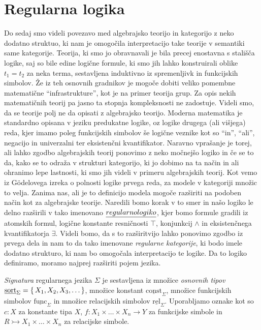 \documentclass[../kategoricna_logika.tex]{subfiles}
\begin{document}
\section{Regularna logika}
Do sedaj smo videli povezavo med algebrajsko teorijo in kategorijo z neko dodatno struktuo, ki nam je omogočila interpretacijo take teorije v semantiki same kategorije. Teorija, ki smo jo obravnavali je bila precej enostavna s stališča logike, saj so bile edine logične formule, ki smo jih lahko konstruirali oblike $t_1 = t_2$ za neka terma, sestavljena induktivno iz spremenljivk in funkcijskih simbolov. 
Že iz teh osnovnih gradnikov je mogoče dobiti veliko pomembne matematične ``infrastrukture'', kot je na primer teorija grup. Za opis nekih matematičnih teorij pa jasno ta stopnja kompleksnosti ne zadostuje.
Videli smo, da se teorije polj ne da opisati z algebrajsko teorijo. Moderna matematika je standardno opisana v jeziku predukatne logike, oz logike drugega (ali višjega) reda, kjer imamo poleg funkcijskih simbolov še logične veznike kot so ``in'', ``ali'', negacijo in univerzalni ter eksistenčni kvantifikator.
Naravno vprašanje je torej, ali lahko zgodbo algebrajskih teorij ponovimo z neko močnejšo logiko in če se to da, kako se to odraža v strukturi kategorijo, ki jo dobimo na ta način in ali ohranimo lepe lastnosti, ki smo jih videli v primeru algebrajskih teorij.
Kot vemo iz Gödelovega izreka o polnosti logike prvega reda, za modele v kategoriji množic to velja. Zanima nas, ali je to definicijo modela mogoče razširiti na podoben način kot za algebrajske teorije.
Naredili bomo korak v to smer in našo logiko le delno razširili v tako imenovano $\emph{regularno logiko}$, kjer bomo formule gradili iz atomskih formul, logične konstante resničnosti $\top$, konjunkcij $\wedge$ in eksistenčnega kvantifikatorja $\exists$.
Videli bomo, da s to razširitvijo lahko ponovimo zgodbo iz prvega dela in nam to da tako imenovane \emph{regularne kategorije}, ki bodo imele dodatno strukturo, ki nam bo omogočala interpretacijo te logike.
Da to logiko definiramo, moramo najprej razširiti pojem jezika.
%
\begin{definicija}
  \emph{Signatura} regularnega jezika $\Sigma$ je sestavljena iz množice \emph{osnovnih tipov} $\underline{\mathrm{sort}}_\Sigma = \left\lbrace\,X_1, X_2, X_3, \ldots\,\right\rbrace$, množice konstant $\underline{\mathrm{const}}_\Sigma$, množice funkcijskih simbolov $\underline{\mathrm{func}}_\Sigma$ in množice relacijskih simbolov $\underline{\mathrm{rel}}_\Sigma$. Uporabljamo oznake kot so $c : X$ za konstante tipa $X$, $f : X_1 \times \ldots \times X_n \to Y$ za funkcijske simbole in $R \rightarrowtail X_1 \times \ldots \times X_n$ za relacijske simbole.
\end{definicija}
\end{document}
